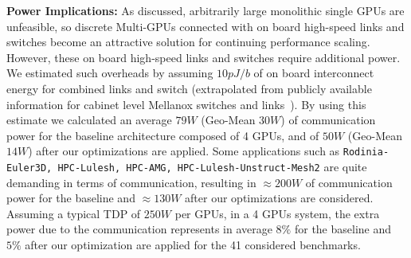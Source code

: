\textbf{Power Implications:} As discussed, arbitrarily large monolithic 
single GPUs are unfeasible, so discrete Multi-GPUs connected with on board 
high-speed links and switches become an attractive solution for continuing 
performance scaling. However, these on board high-speed links and switches 
require additional power. We estimated such overheads by assuming $10 pJ/b$ of 
on board interconnect energy for combined links and switch (extrapolated from 
publicly available information for cabinet level Mellanox switches and 
links~\cite{mlswitch,mlnic}). By using this estimate we calculated an average 
$79 W$ (Geo-Mean $30 W$) of communication power for the baseline 
architecture composed of 4 GPUs, and of $50 W$ (Geo-Mean $14 W$) after 
our optimizations are applied. Some applications such as 
\texttt{Rodinia-Euler3D, HPC-Lulesh, HPC-AMG, HPC-Lulesh-Unstruct-Mesh2} are 
quite demanding in terms of communication, resulting in $\approx 200 W$ 
of communication power for the baseline and $\approx 130 W$ after our 
optimizations are considered. Assuming a typical TDP of $250 W$ per GPUs, 
in a 4 GPUs system, the extra power due to the communication represents in 
average $8\%$ for the baseline and $5\%$ after our optimization are applied 
for the 41 considered benchmarks.